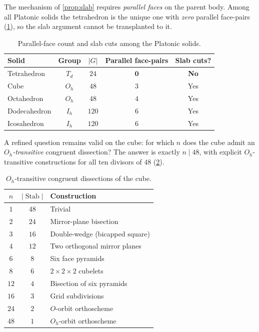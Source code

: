 \documentclass[11pt,a4paper]{article}
\theoremstyle{plain}
\theoremstyle{definition}
\theoremstyle{remark}
\DeclareMathOperator{\Stab}{Stab}
\newcommand{\Td}{T_{\!d}}
\begin{document}
The mechanism of \cref{prop:slab} requires \emph{parallel faces} on the
parent body.  Among all Platonic solids the tetrahedron is the unique one
with \emph{zero} parallel face-pairs (\cref{tab:platonic}), so the slab
argument cannot be transplanted to it.

\begin{table}[H]
\centering\small
\caption{Parallel-face count and slab cuts among the Platonic solids.}
\label{tab:platonic}
\begin{tabular}{@{}lcccc@{}}
\toprule
Solid & Group & $|G|$ & Parallel face-pairs & Slab cuts? \\
\midrule
Tetrahedron  & $\Td$   & $24$  & $\mathbf{0}$ & \textbf{No} \\
Cube         & $O_{h}$ & $48$  & $3$          & Yes \\
Octahedron   & $O_{h}$ & $48$  & $4$          & Yes \\
Dodecahedron & $I_{h}$ & $120$ & $6$          & Yes \\
Icosahedron  & $I_{h}$ & $120$ & $6$          & Yes \\
\bottomrule
\end{tabular}
\end{table}

A refined question remains valid on the cube: for which $n$ does the cube
admit an \emph{$O_{h}$-transitive} congruent dissection?  The answer is
exactly $n \mid 48$, with explicit $O_{h}$-transitive constructions for all
ten divisors of $48$ (\cref{tab:oh-div}).

\begin{table}[H]
\centering\small
\caption{$O_{h}$-transitive congruent dissections of the cube.}
\label{tab:oh-div}
\begin{tabular}{@{}ccl@{}}
\toprule
$n$ & $|\Stab|$ & Construction \\
\midrule
$1$  & $48$ & Trivial \\
$2$  & $24$ & Mirror-plane bisection \\
$3$  & $16$ & Double-wedge (bicapped square) \\
$4$  & $12$ & Two orthogonal mirror planes \\
$6$  & $8$  & Six face pyramids \\
$8$  & $6$  & $2 \times 2 \times 2$ cubelets \\
$12$ & $4$  & Bisection of six pyramids \\
$16$ & $3$  & Grid subdivisions \\
$24$ & $2$  & $O$-orbit orthoscheme \\
$48$ & $1$  & $O_{h}$-orbit orthoscheme \\
\bottomrule
\end{tabular}
\end{table}
\end{document}
